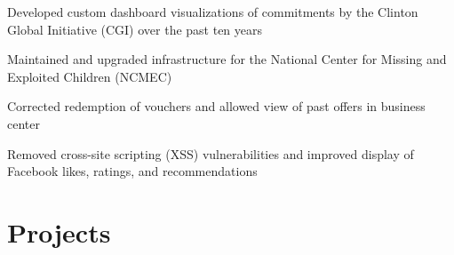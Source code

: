 \documentclass{onkursen-resume}
\begin{document}
\begin{itemize*}
\item Developed custom dashboard visualizations of commitments by the Clinton Global Initiative (CGI) over the past ten years
\item Maintained and upgraded infrastructure for the National Center for Missing and Exploited Children (NCMEC)
\end{itemize*}
\vspace{-1mm}

\begin{itemize*}
\item Corrected redemption of vouchers and allowed view of past offers in business center
\end{itemize*}
\vspace{-1mm}

\begin{itemize*}
\item Removed cross-site scripting (XSS) vulnerabilities and improved display of Facebook likes, ratings, and recommendations
\end{itemize*}
\vspace{-1mm}

\hr


\section*{Projects}
\end{document}
